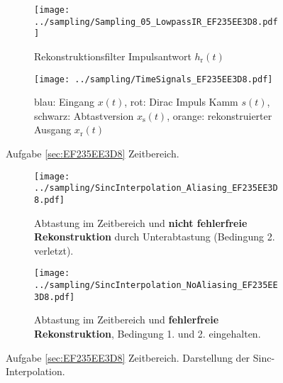 \begin{figure*}[h!]
\centering
\begin{subfigure}{0.75\textwidth}
\texttt{[image: ../sampling/Sampling\_05\_LowpassIR\_EF235EE3D8.pdf]}
\caption{Rekonstruktionsfilter Impulsantwort $h_\mathrm{r}(t)$}
\label{fig:Sampling_05_LowpassIR_EF235EE3D8}
\end{subfigure}

\begin{subfigure}{0.75\textwidth}
\texttt{[image: ../sampling/TimeSignals\_EF235EE3D8.pdf]}
\caption{blau: Eingang $x(t)$, rot: Dirac Impuls Kamm $s(t)$,
schwarz: Abtastversion $x_\mathrm{s}(t)$, orange: rekonstruierter Ausgang $x_\mathrm{r}(t)$}
\label{fig:TimeSignals_EF235EE3D8}
\end{subfigure}
\caption{Aufgabe \ref{sec:EF235EE3D8} Zeitbereich.}
\label{fig:EF235EE3D8_TimeDomain}
\end{figure*}





\begin{figure*}[h!]
\centering
\begin{subfigure}{0.75\textwidth}
\texttt{[image: ../sampling/SincInterpolation\_Aliasing\_EF235EE3D8.pdf]}
\caption{Abtastung im Zeitbereich und \textbf{nicht fehlerfreie Rekonstruktion}
durch Unterabtastung (Bedingung 2. verletzt).}
\label{fig:SincInterpolation_Aliasing_EF235EE3D8}
\end{subfigure}

\begin{subfigure}{0.75\textwidth}
\texttt{[image: ../sampling/SincInterpolation\_NoAliasing\_EF235EE3D8.pdf]}
\caption{Abtastung im Zeitbereich und \textbf{fehlerfreie Rekonstruktion},
Bedingung 1. und 2. eingehalten.}
\label{fig:SincInterpolation_NoAliasing_EF235EE3D8}
\end{subfigure}
\caption{Aufgabe \ref{sec:EF235EE3D8} Zeitbereich.
Darstellung der Sinc-Interpolation.}
\label{fig:SincInterpolation_EF235EE3D8}
\end{figure*}






\clearpage

